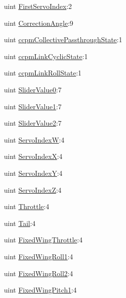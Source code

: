 \begin{DoxyCompactItemize}
\item 
uint \hyperlink{group___config_plugin_ga7db78067a379a075d4ead422019337d3}{\-First\-Servo\-Index}\-:2
\item 
uint \hyperlink{group___config_plugin_ga9540a6905aee7cc229adfd3bd687b86a}{\-Correction\-Angle}\-:9
\item 
uint \hyperlink{group___config_plugin_ga14bffa0ebae107df7ec9a9b6e06294a9}{ccpm\-Collective\-Passthrough\-State}\-:1
\item 
uint \hyperlink{group___config_plugin_ga31785760b6dab4f2006d4824ef4b7e5b}{ccpm\-Link\-Cyclic\-State}\-:1
\item 
uint \hyperlink{group___config_plugin_gaecc16f8488db13ba16c2c6e1d0053239}{ccpm\-Link\-Roll\-State}\-:1
\item 
uint \hyperlink{group___config_plugin_ga2787c0bb4ab205071860d7a5c90cb7a6}{\-Slider\-Value0}\-:7
\item 
uint \hyperlink{group___config_plugin_gab1ae7499273b5e51087ce2da94c0acab}{\-Slider\-Value1}\-:7
\item 
uint \hyperlink{group___config_plugin_ga86cc56b0247155cf5d5ef0e31d509fed}{\-Slider\-Value2}\-:7
\item 
uint \hyperlink{group___config_plugin_gaffe6aa75cde814b5068ce3494b2abb34}{\-Servo\-Index\-W}\-:4
\item 
uint \hyperlink{group___config_plugin_ga0d592171bd6f7381c2a33dfed5f7c40d}{\-Servo\-Index\-X}\-:4
\item 
uint \hyperlink{group___config_plugin_ga517baa5d4109f802400efeb8a5897b1b}{\-Servo\-Index\-Y}\-:4
\item 
uint \hyperlink{group___config_plugin_ga661c3e27f6844865ea7244fa1363516e}{\-Servo\-Index\-Z}\-:4
\item 
uint \hyperlink{group___config_plugin_ga5045493288e2ee044c68dafe0a02b05c}{\-Throttle}\-:4
\item 
uint \hyperlink{group___config_plugin_ga904a0b19b372c87ddf027435cd9e7723}{\-Tail}\-:4
\item 
uint \hyperlink{group___config_plugin_ga2c5e7e1c1622df1735c63b2a700b1f30}{\-Fixed\-Wing\-Throttle}\-:4
\item 
uint \hyperlink{group___config_plugin_ga674f11a566247fc5041091e940c5d679}{\-Fixed\-Wing\-Roll1}\-:4
\item 
uint \hyperlink{group___config_plugin_ga1d932ff664060c5dd74bb8ec48b4d8ff}{\-Fixed\-Wing\-Roll2}\-:4
\item 
uint \hyperlink{group___config_plugin_ga13162fedce809405cef3920e6e81a8bc}{\-Fixed\-Wing\-Pitch1}\-:4

\end{DoxyCompactItemize}
